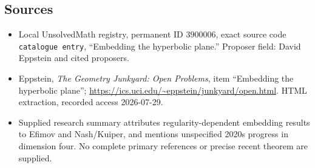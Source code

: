 \documentclass[11pt]{article}
\begin{document}
\subsection{Sources}
\begin{itemize}
\item Local UnsolvedMath registry, permanent ID \(3900006\), exact source code \texttt{catalogue entry}, ``Embedding the hyperbolic plane.'' Proposer field: David Eppstein and cited proposers.
\item Eppstein, \emph{The Geometry Junkyard: Open Problems}, item ``Embedding the hyperbolic plane''; \url{https://ics.uci.edu/~eppstein/junkyard/open.html}. HTML extraction, recorded access 2026-07-29.
\item Supplied research summary attributes regularity-dependent embedding results to Efimov and Nash/Kuiper, and mentions unspecified 2020s progress in dimension four. No complete primary references or precise recent theorem are supplied.
\end{itemize}
\end{document}
